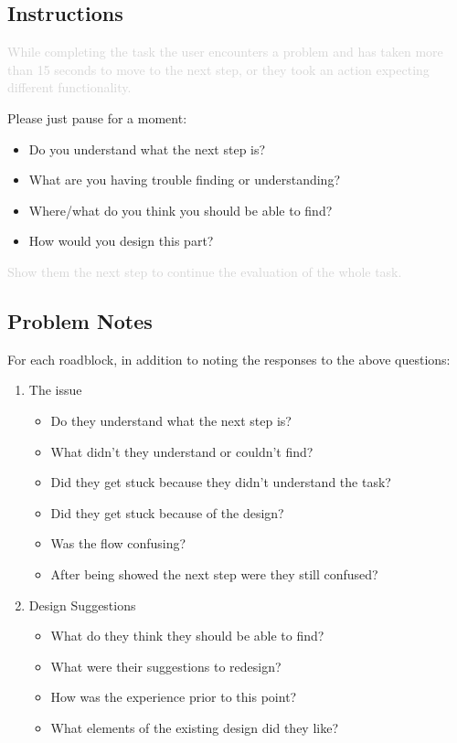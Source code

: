 \documentclass[a4 paper, 12pt]{article}
\begin{document}
    \subsection*{Instructions}
        \textcolor{lightgray}{While completing the task the user encounters a problem and has taken more than 15 seconds to move to the next step, or they took an action expecting different functionality.}

        \begin{itshape}
        Please just pause for a moment:
            \begin{itemize}
                \item Do you understand what the next step is?
                \item What are you having trouble finding or understanding?
                \item Where/what do you think you should be able to find?
                \item How would you design this part?
            \end{itemize}
        \end{itshape}

        \textcolor{lightgray}{Show them the next step to continue the evaluation of the whole task.}

    \subsection*{Problem Notes}
    For each roadblock, in addition to noting the responses to the above questions:
    \begin{enumerate}
        \item The issue
            \begin{itemize}
                \item Do they understand what the next step is?
                \item What didn't they understand or couldn't find?        
                \item Did they get stuck because they didn’t understand the task?
                \item Did they get stuck because of the design?
                \item Was the flow confusing?
                \item After being showed the next step were they still confused?    
            \end{itemize}   
        \item Design Suggestions
            \begin{itemize}
                \item What do they think they should be able to find? 
                \item What were their suggestions to redesign?
                \item How was the experience prior to this point?
                \item What elements of the existing design did they like?
            \end{itemize}
    \end{enumerate}
\end{document}
